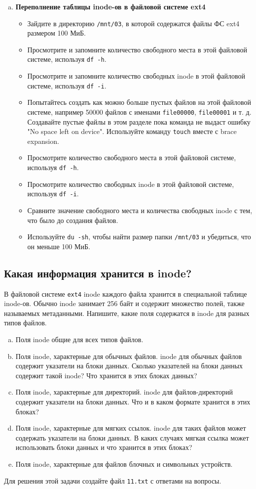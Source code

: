 \documentclass{article}
\begin{document}
\begin{enumerate}[(a)]
\item \textbf{Переполнение таблицы inode-ов в файловой системе ext4}
\begin{itemize}
\item Зайдите в директорию \texttt{/mnt/03}, в которой содержатся файлы ФС ext4 размером 100 МиБ.
\item Просмотрите и запомните количество свободного места в этой файловой системе, используя \texttt{df -h}.
\item Просмотрите и запомните количество свободных inode в этой файловой системе, используя \texttt{df -i}.
\item Попытайтесь создать как можно больше пустых файлов на этой файловой системе, например 50000 файлов с именами \texttt{file00000}, \texttt{file00001} и т. д. Создавайте пустые файлы в этом разделе пока команда не выдаст ошибку "No space left on device". Используйте команду \texttt{touch} вместе с brace expansion.
\item Просмотрите количество свободного места в этой файловой системе, используя \texttt{df -h}.
\item Просмотрите количество свободных inode в этой файловой системе, используя \texttt{df -i}.
\item Сравните значение свободного места и количества свободных inode с тем, что было до создания файлов.
\item Используйте \texttt{du -sh}, чтобы найти размер папки \texttt{/mnt/03} и убедиться, что он меньше 100 МиБ.
\end{itemize}

\end{enumerate}


\subsection{Какая информация хранится в inode?}
В файловой системе \texttt{ext4} inode каждого файла хранится в специальной таблице inode-ов. Обычно inode занимает 256 байт и содержит множество полей, также называемых метаданными. Напишите, какие поля содержатся в inode для разных типов файлов.
\begin{enumerate}[(a)]
\item Поля inode общие для всех типов файлов.
\item Поля inode, характерные для обычных файлов. inode для обычных файлов содержит указатели на блоки данных. Сколько указателей на блоки данных содержит такой inode?  Что хранится в этих блоках данных?
\item Поля inode, характерные для директорий. inode для файлов-директорий содержит указатели на блоки данных. Что и в каком формате хранится в этих блоках?
\item Поля inode, характерные для мягких ссылок. inode для таких файлов может содержать указатели на блоки данных. В каких случаях мягкая ссылка может использовать блоки данных и что хранится в этих блоках?
\item Поля inode, характерные для файлов блочных и символьных устройств.
\end{enumerate}
Для решения этой задачи создайте файл \texttt{11.txt} с ответами на вопросы.
\end{document}
